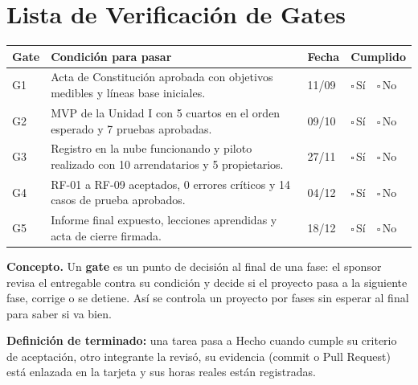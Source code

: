 \documentclass[11pt,a4paper]{article}
\newcommand{\marca}{{\Large$\square$}\,{\scriptsize Sí}\ \ {\Large$\square$}\,{\scriptsize No}}
\begin{document}
\section{Lista de Verificación de Gates}
{\small
{}
\noindent\begin{tabularx}{\textwidth}{@{}C{0.9cm} L C{1.5cm} C{2.0cm}@{}}
\toprule
{}
\textbf{Gate} & \textbf{Condición para pasar} & \textbf{Fecha} & \textbf{Cumplido} \\
\midrule
G1 & Acta de Constitución aprobada con objetivos medibles y líneas base iniciales. & 11/09 & \marca \\
G2 & MVP de la Unidad I con 5 cuartos en el orden esperado y 7 pruebas aprobadas. & 09/10 & \marca \\
G3 & Registro en la nube funcionando y piloto realizado con 10 arrendatarios y 5 propietarios. & 27/11 & \marca \\
G4 & RF-01 a RF-09 aceptados, 0 errores críticos y 14 casos de prueba aprobados. & 04/12 & \marca \\
G5 & Informe final expuesto, lecciones aprendidas y acta de cierre firmada. & 18/12 & \marca \\
\bottomrule
\end{tabularx}
}

\vspace{0.15cm}
{\small\noindent\textbf{Concepto.} Un \textbf{gate} es un punto de decisión al final de una fase: el sponsor revisa el entregable contra su condición y decide si el proyecto pasa a la siguiente fase, corrige o se detiene. Así se controla un proyecto por fases sin esperar al final para saber si va bien.}

\vspace{0.15cm}
{\small\noindent\textbf{Definición de terminado:} una tarea pasa a Hecho cuando cumple su criterio de aceptación, otro integrante la revisó, su evidencia (commit o Pull Request) está enlazada en la tarjeta y sus horas reales están registradas.}
\end{document}

